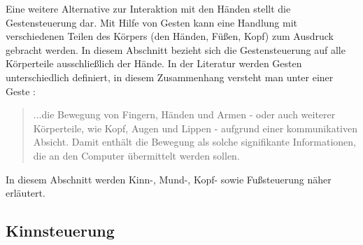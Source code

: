 Eine weitere Alternative zur Interaktion mit den Händen stellt die Gestensteuerung dar. Mit Hilfe von Gesten kann eine Handlung mit verschiedenen Teilen des Körpers (\zB den Händen, Füßen, Kopf) zum Ausdruck gebracht werden. In diesem Abschnitt bezieht sich die Gestensteuerung auf alle Körperteile ausschließlich der Hände. In der Literatur werden Gesten unterschiedlich definiert, in diesem Zusammenhang versteht man unter einer Geste \cite{PreimDachselt}:
\begin{quote} ...die Bewegung von Fingern, Händen und Armen - oder auch weiterer Körperteile, wie Kopf, Augen und Lippen - aufgrund einer kommunikativen Absicht. Damit enthält die Bewegung als solche signifikante Informationen, die an den Computer übermittelt werden sollen. \end{quote}
In diesem Abschnitt werden Kinn-, Mund-, Kopf- sowie Fußsteuerung näher erläutert. 
%
%
\subsection{Kinnsteuerung}
\label{cha:Kinnsteuerung}

